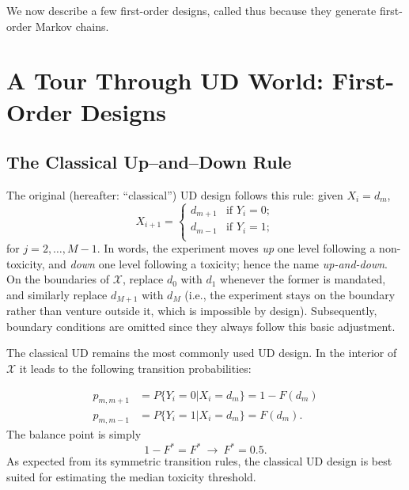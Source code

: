 We now describe a few first-order designs, called thus because they generate first-order Markov chains.

\section{A Tour Through UD World: First-Order Designs}\label{sec:tour}
\subsection{The Classical Up--and--Down Rule}

The original (hereafter: ``classical'') UD design follows this rule: given $X_i=d_m$,
\begin{equation*}
X_{i+1}=
\begin{cases}
d_{m+1} &\textrm{if $Y_i=0$};\\
d_{m-1} &\textrm{if $Y_i=1$};\\
\end{cases}
\end{equation*}
for $j=2,\ldots,M-1$. In words, the experiment moves \emph{up} one level following a non-toxicity, and \emph{down} one level following a toxicity; hence the name \emph{up-and-down}. On the boundaries of $\mathcal{X}$, replace $d_0$ with $d_1$ whenever the former is mandated, and similarly replace $d_{M+1}$ with $d_M$ (i.e., the experiment stays on the boundary rather than venture outside it, which is impossible by design). Subsequently, boundary conditions are omitted since they always follow this basic adjustment.  

The classical UD remains the most commonly used UD design. In the interior of $\mathcal{X}$ it leads to the following transition probabilities:

\begin{equation}
\begin{array}{rl}
p_{m,m+1}&=P\{Y_i=0|X_i=d_m\}=1-F(d_m)\\
p_{m,m-1}&=P\{Y_i=1|X_i=d_m\}=F(d_m).
\end{array}
\end{equation}
The balance point is simply
\begin{equation*}
1-F^*=F^*\ \longrightarrow \   F^*=0.5.
\end{equation*}
As expected from its symmetric transition rules, the classical UD design is best suited for estimating the median toxicity threshold.

